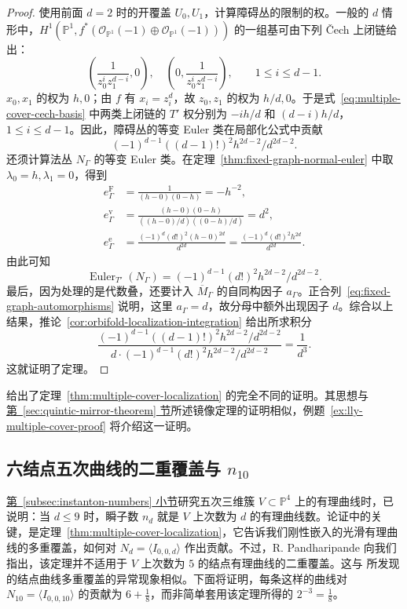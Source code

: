 \begin{proof}
使用前面 $d=2$ 时的开覆盖 $U_0,U_1$，计算障碍丛的限制的权。一般的 $d$ 情形中，$H^1(\mathbb P^1,f^*(\mathcal O_{\mathbb P^1}(-1)\oplus\mathcal O_{\mathbb P^1}(-1)))$ 的一组基可由下列 Čech 上闭链给出：
\begin{equation}\label{eq:multiple-cover-cech-basis}
\left(\frac1{z_0^iz_1^{d-i}},0\right),\quad
\left(0,\frac1{z_0^iz_1^{d-i}}\right),\qquad1\le i\le d-1.
\end{equation}
$x_0,x_1$ 的权为 $h,0$；由 $f$ 有 $x_i=z_i^d$，故 $z_0,z_1$ 的权为 $h/d,0$。于是式~\eqref{eq:multiple-cover-cech-basis} 中两类上闭链的 $T'$ 权分别为 $-ih/d$ 和 $(d-i)h/d$，$1\le i\le d-1$。因此，障碍丛的等变 Euler 类在局部化公式中贡献
\[
(-1)^{d-1}((d-1)!)^2h^{2d-2}/d^{2d-2}.
\]
还须计算法丛 $N_\Gamma$ 的等变 Euler 类。在定理~\ref{thm:fixed-graph-normal-euler} 中取 $\lambda_0=h,\lambda_1=0$，得到
\begin{align*}
e_\Gamma^{\mathrm F}&=\frac1{(h-0)(0-h)}=-h^{-2},\\
e_\Gamma^{\mathrm v}&=\frac{(h-0)(0-h)}{((h-0)/d)((0-h)/d)}=d^2,\\
e_\Gamma^{\mathrm e}&=\frac{(-1)^d(d!)^2(h-0)^{2d}}{d^{2d}}
=\frac{(-1)^d(d!)^2h^{2d}}{d^{2d}}.
\end{align*}
由此可知
\[
\operatorname{Euler}_{T'}(N_\Gamma)=(-1)^{d-1}(d!)^2h^{2d-2}/d^{2d-2}.
\]
最后，因为处理的是代数叠，还要计入 $\overline M_\Gamma$ 的自同构因子 $a_\Gamma$。正合列~\eqref{eq:fixed-graph-automorphisms} 说明，这里 $a_\Gamma=d$，故分母中额外出现因子 $d$。综合以上结果，推论~\ref{cor:orbifold-localization-integration} 给出所求积分
\[
\frac{(-1)^{d-1}((d-1)!)^2h^{2d-2}/d^{2d-2}}
{d\cdot(-1)^{d-1}(d!)^2h^{2d-2}/d^{2d-2}}=\frac1{d^3}.
\]
这就证明了定理。
\end{proof}

 给出了定理~\ref{thm:multiple-cover-localization} 的完全不同的证明。其思想与\hyperref[sec:quintic-mirror-theorem]{第~\ref*{sec:quintic-mirror-theorem} 节}所述镜像定理的证明相似，例题~\ref{ex:lly-multiple-cover-proof} 将介绍这一证明。

\subsection{六结点五次曲线的二重覆盖与 \texorpdfstring{$n_{10}$}{n10}}\label{subsec:nodal-quintic-double-covers}
\hyperref[subsec:instanton-numbers]{第~\ref*{subsec:instanton-numbers} 小节}研究五次三维簇 $V\subset\mathbb P^4$ 上的有理曲线时，已说明：当 $d\le9$ 时，瞬子数 $n_d$ 就是 $V$ 上次数为 $d$ 的有理曲线数。论证中的关键，是定理~\ref{thm:multiple-cover-localization}，它告诉我们刚性嵌入的光滑有理曲线的多重覆盖，如何对 $N_d=\langle I_{0,0,d}\rangle$ 作出贡献。不过，R. Pandharipande 向我们指出，该定理并不适用于 $V$ 上次数为 $5$ 的结点有理曲线的二重覆盖。这与  所发现的结点曲线多重覆盖的异常现象相似。下面将证明，每条这样的曲线对 $N_{10}=\langle I_{0,0,10}\rangle$ 的贡献为 $6+\frac18$，而非简单套用该定理所得的 $2^{-3}=\frac18$。

